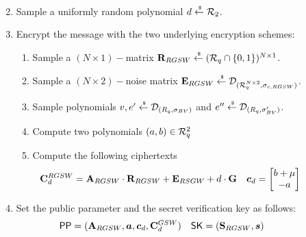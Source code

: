 \begin{description}
\begin{enumerate}
\begin{enumerate}
\begin{align*}
        \end{align*}
      \end{enumerate}
    \item Sample a uniformly random polynomial $d \stackrel{{\scriptscriptstyle \mkern4mu \$}}{\gets} {\mathcal{R}}_2$.
    \item Encrypt the message with the two underlying encryption schemes:
      \begin{enumerate}
      \item Sample a $(N \times 1)-$matrix $\mathbf{R}_{RGSW} \stackrel{{\scriptscriptstyle \mkern4mu \$}}{\gets} ({\mathcal{R}}_q \cap\{0,1\})^{N \times 1}$.
      \item Sample a $(N \times 2)-$noise matrix $\mathbf{E}_{RGSW} \stackrel{{\scriptscriptstyle \mkern4mu \$}}{\gets} \mathcal{D}_{({\mathcal{R}}_q^{N \times 2}, \sigma_{c, RGSW})}$.
      \item Sample polynomials $v,e' \stackrel{{\scriptscriptstyle \mkern4mu \$}}{\gets} \mathcal{D}_{(R_q, \sigma_{BV})}$ and $e'' \stackrel{{\scriptscriptstyle \mkern4mu \$}}{\gets}  \mathcal{D}_{(R_q, \sigma_{BV}')}$.
      \item Compute two polynomials $(a, b) \in {\mathcal{R}}_q^2$
      \item Compute the following ciphertexts
        \begin{align*}
          \mat{C}_d^{RGSW} &= \mat{A}_{RGSW} \cdot \mat{R}_{RGSW} + \mat{E}_{RSGW} +  d \cdot \mat{G} &
          \vec{c}_d &= \begin{bmatrix} b + \mu \\ -a \end{bmatrix}
        \end{align*}
      \end{enumerate}
    \item Set the public parameter and the secret verification key as follows:
      \begin{align*}
        \PPP &= (\mat{A}_{RGSW}, \vec{a}, \vec{c}_d, \mat{C}_d^{GSW}) & \SK &= (\mat{S}_{RGSW}, \vec{s})
      \end{align*}
  \end{enumerate}




\end{description}
